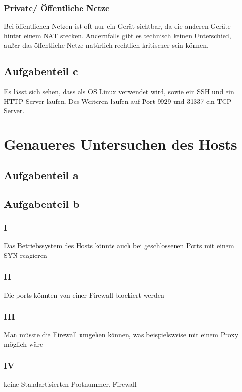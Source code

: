 \documentclass[a4paper,12pt,
headsepline,           %
oneside,               %
pointlessnumbers,      %
bibtotoc,              %
BCOR15mm               %
]{scrbook}
\begin{document}
\subsubsection*{Private/ Öffentliche Netze}
Bei öffentlichen Netzen ist oft nur ein Gerät sichtbar, da die anderen Geräte hinter einem NAT stecken. Andernfalls gibt es technisch keinen Unterschied, außer das öffentliche Netze natürlich rechtlich kritischer sein können.

\subsection*{Aufgabenteil c}


Es lässt sich sehen, dass als OS Linux verwendet wird, sowie  ein SSH und ein HTTP Server laufen. Des Weiteren laufen auf Port 9929 und 31337 ein TCP Server.

\section*{Genaueres Untersuchen des Hosts}
\subsection*{Aufgabenteil a}

\subsection*{Aufgabenteil b}
\subsubsection*{I}
Das Betriebssystem des Hosts könnte auch bei geschlossenen Ports mit einem SYN reagieren
\subsubsection*{II}
Die ports könnten von einer Firewall blockiert werden
\subsubsection*{III}
Man müsste die Firewall umgehen können, was beispielsweise mit einem Proxy möglich wäre
\subsubsection*{IV}
keine Standartisierten Portnummer, Firewall
\end{document}
